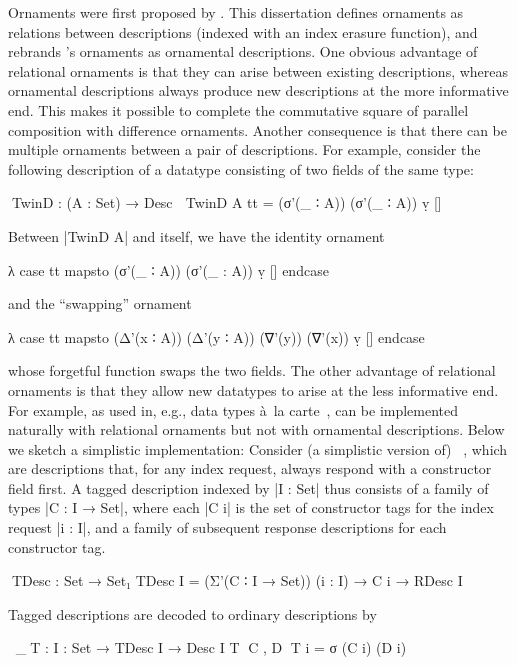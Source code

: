 Ornaments were first proposed by \citet{McBride-ornaments}.
This dissertation defines ornaments as relations between descriptions (indexed with an index erasure function), and rebrands \citeauthor{McBride-ornaments}'s ornaments as ornamental descriptions.
One obvious advantage of relational ornaments is that they can arise between existing descriptions, whereas ornamental descriptions always produce new descriptions at the more informative end.
This makes it possible to complete the commutative square of parallel composition with difference ornaments.
Another consequence is that there can be multiple ornaments between a pair of descriptions.
For example, consider the following description of a datatype consisting of two fields of the same type:
\begin{code}
^^^TwinD : (A : Set) → Desc ⊤
TwinD A tt = (σ'(_ ∶ A)) (σ'(_ ∶ A)) ṿ []
\end{code}
Between |TwinD A| and itself, we have the identity ornament
\begin{code}
λ case tt mapsto (σ'(_ ∶ A)) (σ'(_ : A)) ṿ [] endcase
\end{code}
and the ``swapping'' ornament
\begin{code}
λ case tt mapsto (Δ'(x ∶ A)) (Δ'(y ∶ A)) (∇'(y)) (∇'(x)) ṿ [] endcase
\end{code}
whose forgetful function swaps the two fields.
The other advantage of relational ornaments is that they allow new datatypes to arise at the less informative end.
For example,  as used in, e.g., data types à~la carte~\citep{Swierstra-data-types-a-la-carte}, can be implemented naturally with relational ornaments but not with ornamental descriptions.
Below we sketch a simplistic implementation: Consider (a simplistic version of) ~\citep{Chapman-levitation}, which are descriptions that, for any index request, always respond with a constructor field first.
A tagged description indexed by |I : Set| thus consists of a family of types |C : I → Set|, where each |C i| is the set of constructor tags for the index request |i : I|, and a family of subsequent response descriptions for each constructor tag.
\begin{code}
^^^TDesc : Set → Set₁
TDesc I = (Σ'(C ∶ I → Set)) (i : I) → C i → RDesc I
\end{code}
Tagged descriptions are decoded to ordinary descriptions by
\begin{code}
^^^⌊_⌋T : {I : Set} → TDesc I → Desc I
T⌊ C , D ⌋T i = σ (C i) (D i)
\end{code}
